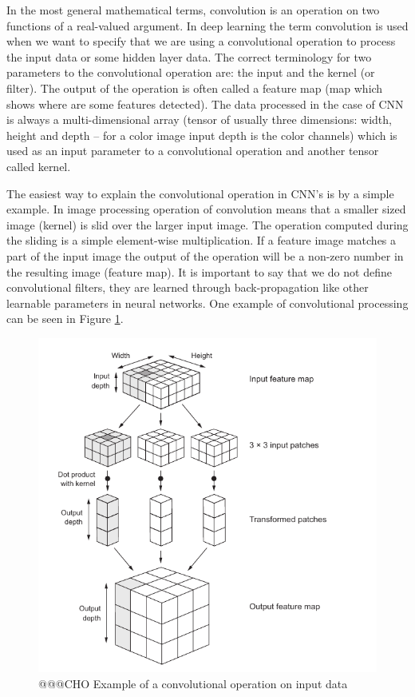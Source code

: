 \documentclass[b5paper]{book}
\begin{document}
In the most general mathematical terms, convolution is an operation on two functions of a real-valued argument. In deep learning the term convolution is used when we want to specify that we are using a convolutional operation to process the input data or some hidden layer data. The correct terminology for two parameters to the convolutional operation are: the input and the kernel (or filter). The output of the operation is often called a feature map (map which shows where are some features detected). The data processed in the case of CNN is always a multi-dimensional array (tensor of usually three dimensions: width, height and depth -- for a color image input depth is the color channels) which is used as an input parameter to a convolutional operation and another tensor called kernel. 

The easiest way to explain the convolutional operation in CNN's is by a simple example. In image processing operation of convolution means that a smaller sized image (kernel) is slid over the larger input image. The operation computed during the sliding is a simple element-wise multiplication. If a feature image matches a part of the input image the output of the operation will be a non-zero number in the resulting image (feature map). It is important to say that we do not define convolutional filters, they are learned through back-propagation like other learnable parameters in neural networks. One example of convolutional processing can be seen in Figure \ref{fig:conv}.

\begin{figure}
    \centering
    \includegraphics[scale=0.5]{figures/conv-chollet.png}
    \caption{@@@CHO Example of a convolutional operation on input data}
    \label{fig:conv}
\end{figure}
\end{document}
